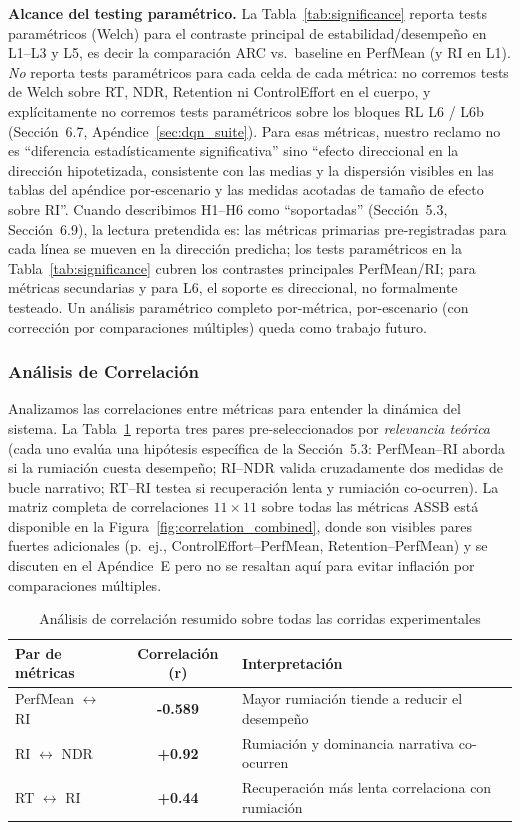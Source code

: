 \documentclass{article}
\begin{document}
\textbf{Alcance del testing paramétrico.} La Tabla~\ref{tab:significance} reporta tests paramétricos (Welch) para el contraste principal de estabilidad/desempeño en L1--L3 y L5, es decir la comparación ARC vs.\ baseline en PerfMean (y RI en L1). \emph{No} reporta tests paramétricos para cada celda de cada métrica: no corremos tests de Welch sobre RT, NDR, Retention ni ControlEffort en el cuerpo, y explícitamente no corremos tests paramétricos sobre los bloques RL L6 / L6b (Sección~6.7, Apéndice~\ref{sec:dqn_suite}). Para esas métricas, nuestro reclamo no es ``diferencia estadísticamente significativa'' sino ``efecto direccional en la dirección hipotetizada, consistente con las medias y la dispersión visibles en las tablas del apéndice por-escenario y las medidas acotadas de tamaño de efecto sobre RI''. Cuando describimos H1--H6 como ``soportadas'' (Sección~5.3, Sección~6.9), la lectura pretendida es: las métricas primarias pre-registradas para cada línea se mueven en la dirección predicha; los tests paramétricos en la Tabla~\ref{tab:significance} cubren los contrastes principales PerfMean/RI; para métricas secundarias y para L6, el soporte es direccional, no formalmente testeado. Un análisis paramétrico completo por-métrica, por-escenario (con corrección por comparaciones múltiples) queda como trabajo futuro.

\subsubsection{Análisis de Correlación}
Analizamos las correlaciones entre métricas para entender la dinámica del sistema. La Tabla~\ref{tab:correlations} reporta tres pares pre-seleccionados por \emph{relevancia teórica} (cada uno evalúa una hipótesis específica de la Sección~5.3: PerfMean--RI aborda si la rumiación cuesta desempeño; RI--NDR valida cruzadamente dos medidas de bucle narrativo; RT--RI testea si recuperación lenta y rumiación co-ocurren). La matriz completa de correlaciones $11\times 11$ sobre todas las métricas ASSB está disponible en la Figura~\ref{fig:correlation_combined}, donde son visibles pares fuertes adicionales (p.\ ej., ControlEffort--PerfMean, Retention--PerfMean) y se discuten en el Apéndice~E pero no se resaltan aquí para evitar inflación por comparaciones múltiples.

\begin{table}[htbp]
\centering
\caption{Análisis de correlación resumido sobre todas las corridas experimentales}
\label{tab:correlations}
\begin{tabular}{@{}lcl@{}}
\toprule
Par de métricas & Correlación (r) & Interpretación \\ \midrule
PerfMean $\leftrightarrow$ RI & \textbf{-0.589} & Mayor rumiación tiende a reducir el desempeño \\
RI $\leftrightarrow$ NDR & \textbf{+0.92} & Rumiación y dominancia narrativa co-ocurren \\
RT $\leftrightarrow$ RI & \textbf{+0.44} & Recuperación más lenta correlaciona con rumiación \\ \bottomrule
\end{tabular}
\end{table}
\end{document}
